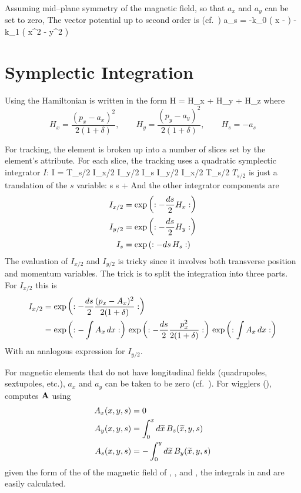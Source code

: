 Assuming mid--plane symmetry of the magnetic field, so
that $a_x$ and $a_y$ can be set to zero\cite{b:madphysics}, The vector
potential up to second order is (cf.~)
\Begineq
  a_s = -k_0 \left( x -  \right) -
   k_1 \left( x^2 - y^2 \right)
  \label{akxgx}
\Endeq

\section{Symplectic Integration}
\label{s:symp.track}

Using  the Hamiltonian is written in the form
\Begineq
  H = H_x + H_y + H_z
\Endeq
where
\begin{equation}
  H_x = \frac{(p_x - a_x)^2}{2 (1 + \delta)}, \qquad
  H_y = \frac{(p_y - a_y)^2}{2 (1 + \delta)}, \qquad
  H_s = - a_s 
\end{equation}

For tracking, the element is broken up into a number of slices set by
the element's  attribute. For each slice, the tracking
uses a quadratic symplectic integrator $I$:
\Begineq
  I = T_{s/2} \; I_{x/2} \; I_{y/2} \; I_s \; I_{y/2} \; I_{x/2} \; T_{s/2}
\Endeq
$T_{s/2}$ is just a translation of the $s$ variable:
\Begineq
  s \rightarrow s + 
\Endeq
And the other integrator components are
\begin{align}
  I_{x/2} &= \exp \left( : -\frac{ds}{2} H_x : \right) \nonumber \\
  I_{y/2} &= \exp \left( : -\frac{ds}{2} H_y : \right) \\
  I_{s}   &= \exp \left( : -ds \, H_s : \right) \nonumber
\end{align}
The evaluation of $I_{x/2}$ and $I_{y/2}$ is tricky since it involves both transverse
position and momentum variables. The trick is to split the integration into three parts.
For $I_{x/2}$ this is
\begin{align}
  I_{x/2} &= \exp \left( : -\frac{ds}{2} \frac{(p_x - A_x)^2}{2 (1 + \delta)} : \right) \nonumber \\
  &= \exp \left( : -\int A_x \, dx : \right) \,
     \exp \left( : -\frac{ds}{2} \frac{p_x^2}{2 (1 + \delta)} : \right) \,
     \exp \left( : \int A_x \, dx : \right)
  \label{ids2}
\end{align}
With an analogous expression for $I_{y/2}$.

For magnetic elements that do not have longitudinal fields
(quadrupoles, sextupoles, etc.), $a_x$ and $a_y$ can be taken to be
zero (cf.~). For wigglers (), \bmad computes ${\bf A}$ using
\begin{align}
  A_x(x,y,s) &= 0 \nonumber \\
  A_y(x,y,s) &=  \int_0^x d\widetilde x \, B_z(\widetilde x, y, s) 
  \label{a0a0a0} \\
  A_s(x,y,s) &= -\int_0^y d\widetilde x \, B_y(\widetilde x, y, s) \nonumber
\end{align}
given the form of the of the magnetic field of , , and
, the integrals in  and  are easily calculated.

